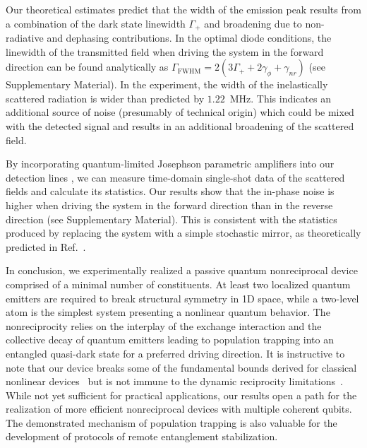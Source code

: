 \documentclass[pra, twocolumn, amsmath, amssymb, notitlepage, longbibliography, showpacs, superscriptaddress]{revtex4-1}
\newcommand{\overbar}[1]{\mkern 1.5mu\overline{\mkern-1.5mu#1\mkern-1.5mu}\mkern 1.5mu}
\begin{document}
Our theoretical estimates predict that the width of the emission peak 
results from a combination of the dark state linewidth $\Gamma_+$
and broadening due to non-radiative and dephasing contributions. 
In the optimal diode conditions, %
the linewidth of the transmitted field when driving the system
in the forward direction can be found analytically as 
$\Gamma_\textrm{FWHM} = 2(3\Gamma_+ + 2 \gamma_{\phi} + \gamma_{nr})$
(see Supplementary Material). 
In the experiment, the width of the inelastically scattered radiation 
is wider than predicted by $1.22$~MHz. 
This indicates an additional source of noise  (presumably of technical origin) 
which could be mixed with the detected signal and results in an additional broadening of the scattered field.


By incorporating quantum-limited Josephson parametric amplifiers  
into our detection lines \cite{Eichler2014}, we can measure time-domain single-shot data 
of the scattered fields and calculate its statistics. %
Our results show that the in-phase noise
is higher when driving the system in the forward direction
than in the reverse direction (see Supplementary Material). 
This is consistent with the statistics produced by replacing the system 
with a simple stochastic mirror, as theoretically predicted in Ref.~\cite{Muller2017a}.


In conclusion, we experimentally realized a passive quantum nonreciprocal device 
comprised of a minimal number of constituents. At least two localized quantum emitters are required to break 
structural symmetry in 1D space, while a two-level atom is the
simplest system presenting a nonlinear quantum behavior. 
The nonreciprocity relies on the interplay of the exchange 
interaction and the collective decay of quantum emitters leading to population 
trapping into an entangled quasi-dark state for a preferred driving direction. It is instructive to note that our device breaks some of the fundamental bounds derived for classical nonlinear devices~\cite{Sounas2017,Sounas2018} but is not immune to the dynamic reciprocity limitations~\cite{Shi2015}.
While not yet sufficient for practical applications, our results open a path for 
the realization of more efficient nonreciprocal devices with multiple coherent qubits. The demonstrated  mechanism of population trapping is 
also valuable for the development of protocols of remote entanglement stabilization.
\end{document}
